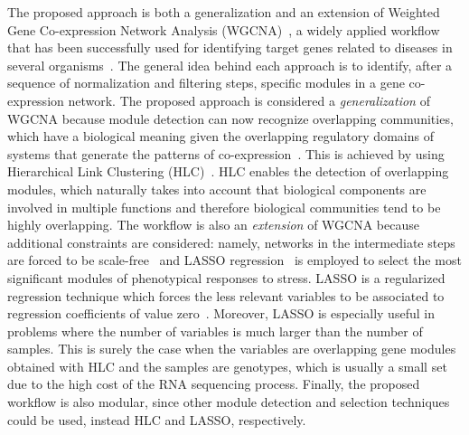 \documentclass{bmcart}
\begin{document}
The proposed approach is both a generalization and an
extension of Weighted Gene Co-expression Network Analysis
(WGCNA)~\cite{langfelder2008wgcna}, a widely applied workflow that has
been successfully used for identifying target genes related to
diseases in several
organisms~\cite{tian2018identifying}. The general idea behind each
approach is to identify, after a sequence of normalization and filtering steps, specific modules in a gene co-expression network. 
The proposed approach
is considered a \textit{generalization} of WGCNA because module
detection can now recognize overlapping communities, which have
a biological meaning given the overlapping regulatory domains of
systems that generate the patterns of co-expression~\cite{gaiteri2014beyond}. This is
achieved by using Hierarchical Link Clustering
(HLC)~\cite{ahn2010link}. 
HLC enables the detection of overlapping modules, which naturally takes
into account that biological components  are involved in
multiple functions and therefore biological communities tend to be
highly overlapping.
The workflow is also an \textit{extension} of WGCNA
because additional constraints are considered:
namely, networks in the intermediate steps are forced to be
scale-free~\cite{barabasi2003scale} and LASSO
regression~\cite{tibshirani1996regression} is employed to select the
most significant modules of phenotypical responses to stress.
LASSO is a regularized
regression technique which forces the less relevant variables to be associated to regression coefficients of value zero~\cite{desboulets2018review}. Moreover, LASSO is especially
useful in problems where the number of variables is much larger than
the number of samples. This is surely the case when the variables are
overlapping gene modules obtained with HLC and the samples are genotypes, which is usually a small set due to the high cost of the RNA sequencing process. 
Finally, the proposed workflow is also modular, since other module detection
and selection techniques could be used, instead HLC and LASSO,
respectively.
\vspace{0.5cm}
\end{document}

